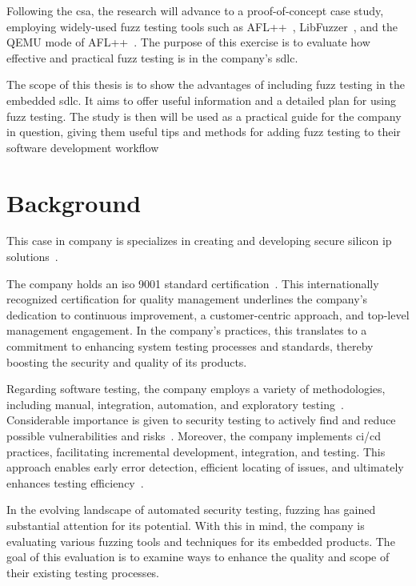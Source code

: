 Following the \gls{csa}, the research will advance to a proof-of-concept case
study, employing widely-used fuzz testing tools such as AFL++~\cite{257204},
LibFuzzer~\cite{libFuzze17:online}, and the QEMU mode of AFL++~\cite{AFLplusp57:online}.
The purpose of this exercise is to evaluate how effective and practical fuzz
testing is in the company's \gls{sdlc}.

The scope of this thesis is to show the advantages of including fuzz testing
in the embedded \gls{sdlc}. It aims to offer useful
information and a detailed plan for using fuzz testing. The study is then will be used
as a practical guide for the
company in question, giving them useful tips and methods for adding fuzz testing
to their software development workflow

\section{Background}

This case in company is specializes
in creating and developing secure silicon \acrlong{ip} solutions~\cite{Whatisan76:online}.

The company holds an \acrlong{iso} 9001 standard certification~\cite{ISOISO9044:online}.
This internationally recognized certification for quality management
underlines the company's dedication to continuous improvement,
a customer-centric approach, and top-level management engagement.
In the company's practices, this translates to a
commitment to enhancing system testing processes and standards, thereby
boosting the security and quality of its products.

Regarding software testing, the company employs a variety of methodologies,
including manual, integration, automation, and exploratory testing~\cite{WhatisEx64:online}.
Considerable importance is given to security testing to actively find and reduce
possible vulnerabilities and risks~\cite{baker2013analyzing}.
Moreover, the company implements \gls{ci/cd} practices,
facilitating incremental development, integration, and testing. This approach
enables early error detection, efficient locating of issues, and
ultimately enhances testing efficiency~\cite{DevOpsin19:online}.

In the evolving landscape of automated security testing, fuzzing has
gained substantial attention for its potential. With this in mind,
the company is evaluating various fuzzing tools and techniques for its
embedded products. The goal of this evaluation is to examine ways to enhance the
quality and scope of their existing testing processes.

